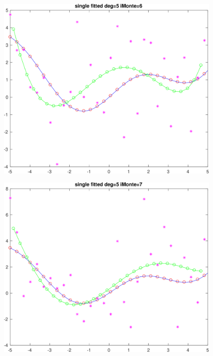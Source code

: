 \begin{figure}[h!]
\centering\includegraphics[scale=0.1]{single_poly_d_5_iMonte_6.png}
\end{figure}

\begin{figure}[h!]
\centering\includegraphics[scale=0.1]{single_poly_d_5_iMonte_7.png}
\end{figure}


